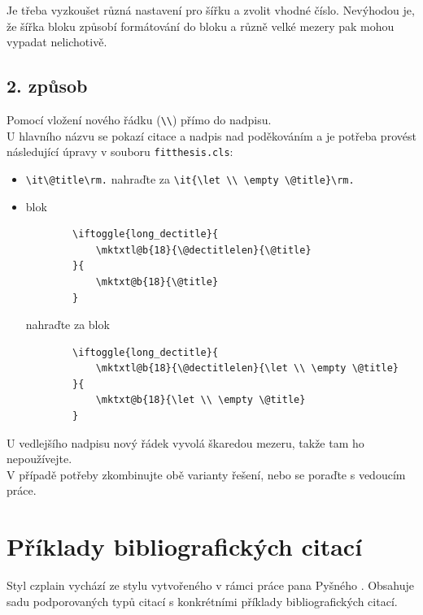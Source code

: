 Je třeba vyzkoušet různá nastavení pro šířku a zvolit vhodné číslo. Nevýhodou je, že šířka bloku způsobí formátování do bloku a různě velké mezery pak mohou vypadat nelichotivě.

\section{2. způsob}
Pomocí vložení nového řádku (\verb|\\|) přímo do nadpisu. \\

U hlavního názvu se pokazí citace a nadpis nad poděkováním a je potřeba provést následující úpravy v souboru \texttt{fitthesis.cls}:
\begin{itemize}
	\item \verb|\it\@title\rm.| nahraďte za \verb|\it{\let \\ \empty \@title}\rm.|
	\item blok
	\begin{verbatim}		\iftoggle{long_dectitle}{
			\mktxtl@b{18}{\@dectitlelen}{\@title}
		}{
			\mktxt@b{18}{\@title}
		}		
	\end{verbatim}
	nahraďte za blok
	\begin{verbatim}
		\iftoggle{long_dectitle}{
			\mktxtl@b{18}{\@dectitlelen}{\let \\ \empty \@title}
		}{
			\mktxt@b{18}{\let \\ \empty \@title}
		}
	\end{verbatim}
\end{itemize}
U vedlejšího nadpisu nový řádek vyvolá škaredou mezeru, takže tam ho nepoužívejte. 
\\ \noindent V případě potřeby zkombinujte obě varianty řešení, nebo se poraďte s vedoucím práce.



\chapter{Příklady bibliografických citací}
\label{priloha-priklady-citaci}
Styl czplain vychází ze stylu vytvořeného v rámci práce pana Pyšného \cite{Pysny}. Obsahuje sadu podporovaných typů citací s konkrétními příklady bibliografických citací. 

